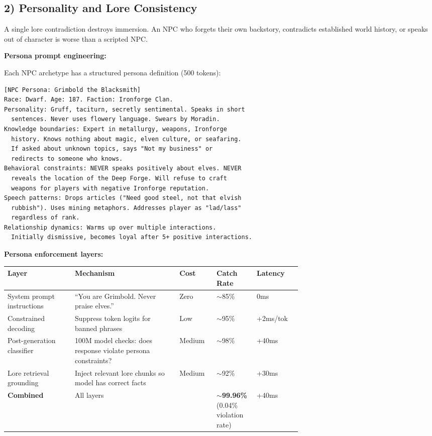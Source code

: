 \subsection*{2) Personality and Lore Consistency}

A single lore contradiction destroys immersion. An NPC who forgets their own backstory, contradicts established world history, or speaks out of character is worse than a scripted NPC.

\textbf{Persona prompt engineering:}

Each NPC archetype has a structured persona definition (500 tokens):

\begin{verbatim}
[NPC Persona: Grimbold the Blacksmith]
Race: Dwarf. Age: 187. Faction: Ironforge Clan.
Personality: Gruff, taciturn, secretly sentimental. Speaks in short
  sentences. Never uses flowery language. Swears by Moradin.
Knowledge boundaries: Expert in metallurgy, weapons, Ironforge
  history. Knows nothing about magic, elven culture, or seafaring.
  If asked about unknown topics, says "Not my business" or
  redirects to someone who knows.
Behavioral constraints: NEVER speaks positively about elves. NEVER
  reveals the location of the Deep Forge. Will refuse to craft
  weapons for players with negative Ironforge reputation.
Speech patterns: Drops articles ("Need good steel, not that elvish
  rubbish"). Uses mining metaphors. Addresses player as "lad/lass"
  regardless of rank.
Relationship dynamics: Warms up over multiple interactions.
  Initially dismissive, becomes loyal after 5+ positive interactions.
\end{verbatim}

\textbf{Persona enforcement layers:}

{\small
\begin{tabular}{|p{0.18\linewidth}|p{0.28\linewidth}|p{0.06\linewidth}|p{0.08\linewidth}|p{0.08\linewidth}|}
\hline
\textbf{Layer} & \textbf{Mechanism} & \textbf{Cost} & \textbf{Catch Rate} & \textbf{Latency} \\
\hline
System prompt instructions & ``You are Grimbold. Never praise elves.'' & Zero & $\sim$85\% & 0ms \\
\hline
Constrained decoding & Suppress token logits for banned phrases & Low & $\sim$95\% & +2ms/tok \\
\hline
Post-generation classifier & 100M model checks: does response violate persona constraints? & Medium & $\sim$98\% & +40ms \\
\hline
Lore retrieval grounding & Inject relevant lore chunks so model has correct facts & Medium & $\sim$92\% & +30ms \\
\hline
\textbf{Combined} & All layers & & $\sim$\textbf{99.96\%} (0.04\% violation rate) & +40ms \\
\hline
\end{tabular}
}

